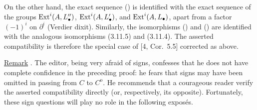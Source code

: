 On the other hand, the exact sequence () is identified with
the exact sequence of the groups $\operatorname{Ext}^i(A,L''_\bullet)$,
$\operatorname{Ext}^i(A,L'_\bullet)$, and $\operatorname{Ext}^i(A,L_\bullet)$, apart from a
factor $(-1)^i$ on $\partial^i$ (Verdier dixit).  Similarly, the
isomorphisms () and () are identified with the analogous
isomorphisms (3.11.5) and (3.11.4).  The asserted compatibility is
therefore the special case of [4, Cor.~5.5] corrected as above.

\underline{Remark} . The editor, being very afraid of signs,
confesses that he does not have complete confidence in the preceding
proof: he fears that signs may have been omitted in passing from
$C$ to $C^{\mathrm o}$.  He recommends that a courageous reader
verify the asserted compatibility directly (or, respectively, its
opposite).  Fortunately, these sign questions will play no role in
the following expos\'es.

